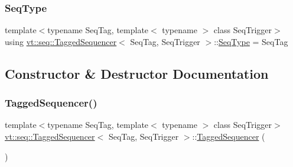 \subsubsection{\texorpdfstring{Seq\+Type}{SeqType}}
{\footnotesize\ttfamily template$<$typename Seq\+Tag, template$<$ typename $>$ class Seq\+Trigger$>$ \\
using \hyperlink{structvt_1_1seq_1_1_tagged_sequencer}{vt\+::seq\+::\+Tagged\+Sequencer}$<$ Seq\+Tag, Seq\+Trigger $>$\+::\hyperlink{structvt_1_1seq_1_1_tagged_sequencer_a1c8ee839258d0f88c49ef660267a81d5}{Seq\+Type} =  Seq\+Tag}



\subsection{Constructor \& Destructor Documentation}
\mbox{\label{structvt_1_1seq_1_1_tagged_sequencer_aef74e4a510da24c2305b0d7097684a27}} 
\subsubsection{\texorpdfstring{Tagged\+Sequencer()}{TaggedSequencer()}}
{\footnotesize\ttfamily template$<$typename Seq\+Tag, template$<$ typename $>$ class Seq\+Trigger$>$ \\
\hyperlink{structvt_1_1seq_1_1_tagged_sequencer}{vt\+::seq\+::\+Tagged\+Sequencer}$<$ Seq\+Tag, Seq\+Trigger $>$\+::\hyperlink{structvt_1_1seq_1_1_tagged_sequencer}{Tagged\+Sequencer} (\begin{DoxyParamCaption}{ }\end{DoxyParamCaption})\hspace{0.3cm}{\ttfamily [default]}}

\mbox{\label{structvt_1_1seq_1_1_tagged_sequencer_aceb5a6bcf3915be2cc5d046c6b789af2}} 

